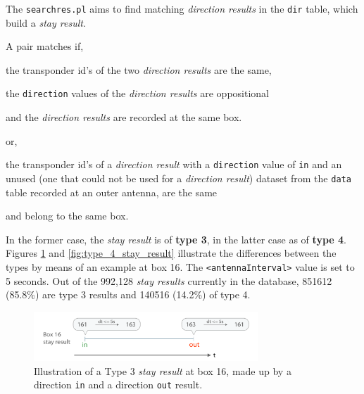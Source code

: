 The \lstinline|searchres.pl| aims to find matching \textit{direction results} in the \lstinline|dir| table, which build a \textit{stay result}.

A pair matches if,

\begin{mylist}
\item the transponder id's of the two \textit{direction results} are the same,
\item the \lstinline|direction| values of the \textit{direction results} are oppositional
\item and the \textit{direction results} are recorded at the same box.
\end{mylist}

or,

\begin{mylist}
\item the transponder id's of a \textit{direction result} with a \lstinline|direction| value of \lstinline|in| and an unused (one that could not be used for a \textit{direction result}) dataset from the \lstinline|data| table recorded at an outer antenna, are the same
\item and belong to the same box.
\end{mylist}

In the former case, the \textit{stay result} is of \textbf{type 3}, in the latter case as of \textbf{type 4}. Figures \ref{fig:type_3_stay_result} and \ref{fig:type_4_stay_result} illustrate the differences between the types by means of an example at box 16. The \lstinline|<antennaInterval>| value is set to 5 seconds. Out of the 992,128 \textit{stay results} currently in the database, 851612 (85.8\%) are type 3 results and 140516 (14.2\%) of type 4.

\begin{figure}[htpb]
\begin{center}
  \includegraphics[width=0.75\textwidth]{assets/pdf/stay_result_type_3_schema.pdf}
  \caption[Illustration of a type 3 \textit{stay result}]{Illustration of a Type 3 \textit{stay result} at box 16,  made up by a direction \lstinline|in| and a direction \lstinline|out| result.}
  \label{fig:type_3_stay_result}
\end{center}
\end{figure}

